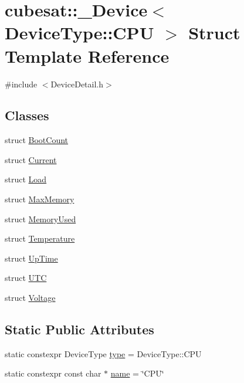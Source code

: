 \hypertarget{structcubesat_1_1__Device_3_01DeviceType_1_1CPU_01_4}{}\section{cubesat\+:\+:\+\_\+\+Device$<$ Device\+Type\+:\+:C\+PU $>$ Struct Template Reference}
\label{structcubesat_1_1__Device_3_01DeviceType_1_1CPU_01_4}


{\ttfamily \#include $<$Device\+Detail.\+h$>$}

\subsection*{Classes}
\begin{DoxyCompactItemize}
\item 
struct \hyperlink{structcubesat_1_1__Device_3_01DeviceType_1_1CPU_01_4_1_1BootCount}{Boot\+Count}
\item 
struct \hyperlink{structcubesat_1_1__Device_3_01DeviceType_1_1CPU_01_4_1_1Current}{Current}
\item 
struct \hyperlink{structcubesat_1_1__Device_3_01DeviceType_1_1CPU_01_4_1_1Load}{Load}
\item 
struct \hyperlink{structcubesat_1_1__Device_3_01DeviceType_1_1CPU_01_4_1_1MaxMemory}{Max\+Memory}
\item 
struct \hyperlink{structcubesat_1_1__Device_3_01DeviceType_1_1CPU_01_4_1_1MemoryUsed}{Memory\+Used}
\item 
struct \hyperlink{structcubesat_1_1__Device_3_01DeviceType_1_1CPU_01_4_1_1Temperature}{Temperature}
\item 
struct \hyperlink{structcubesat_1_1__Device_3_01DeviceType_1_1CPU_01_4_1_1UpTime}{Up\+Time}
\item 
struct \hyperlink{structcubesat_1_1__Device_3_01DeviceType_1_1CPU_01_4_1_1UTC}{U\+TC}
\item 
struct \hyperlink{structcubesat_1_1__Device_3_01DeviceType_1_1CPU_01_4_1_1Voltage}{Voltage}
\end{DoxyCompactItemize}
\subsection*{Static Public Attributes}
\begin{DoxyCompactItemize}
\item 
static constexpr Device\+Type \hyperlink{structcubesat_1_1__Device_3_01DeviceType_1_1CPU_01_4_a962a3e7a7818a91e856a5a5b6c5eaee4}{type} = Device\+Type\+::\+C\+PU
\item 
static constexpr const char $\ast$ \hyperlink{structcubesat_1_1__Device_3_01DeviceType_1_1CPU_01_4_a2541dceeef9a1b93d24c92b016d8fc14}{name} = \char`\"{}C\+PU\char`\"{}
\end{DoxyCompactItemize}


